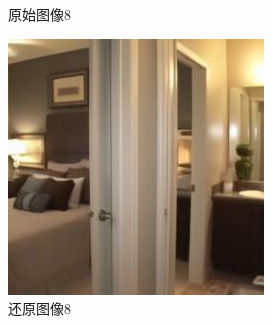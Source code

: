 \begin{figure}[H]
\begin{minipage}[b]{0.3\linewidth}
    \caption{原始图像8}
    \label{original image 8 }
  \end{minipage}
\hspace{0.1cm}
  \begin{minipage}[b]{0.3\linewidth}
    \includegraphics[width=\linewidth]{Picture/recon/00010.png}
    \caption{还原图像8}
    \label{inpainted image 8}
  \end{minipage}
  \label{整块损坏图像}
\end{figure}

